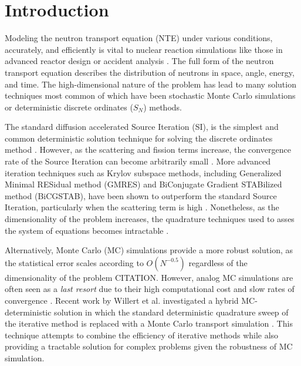\section{Introduction}
\label{sec:intro}

Modeling the neutron transport equation (NTE) under various conditions, accurately, and efficiently is vital to nuclear reaction simulations like those in advanced reactor design or accident analysis \cite{Duderstadt1977}.  The full form of the neutron transport equation describes the distribution of neutrons in space, angle, energy, and time. The high-dimensional nature of the problem has lead to many solution techniques most common of which have been stochastic Monte Carlo simulations or deterministic discrete ordinates ($S_N$) methods. 

The standard diffusion accelerated Source Iteration (SI), is the simplest and common deterministic solution technique for solving the discrete ordinates method \cite{Lewis1984}. However, as the scattering and fission terms increase, the convergence rate of the Source Iteration can become arbitrarily small \cite{Warsa2002}. More advanced iteration techniques such as Krylov subspace methods, including Generalized Minimal RESidual method (GMRES) and BiConjugate Gradient STABilized method (BiCGSTAB), have been shown to outperform the standard Source Iteration, particularly when the scattering term is high \cite{Adams2002, Mcclarren2012}. Nonetheless, as the dimensionality of the problem increases, the quadrature techniques used to asses the system of equations becomes intractable \cite{Willert2013Thesis}.

Alternatively, Monte Carlo (MC) simulations provide a more robust solution, as the statistical error scales according to $O(N^{-0.5})$ regardless of the dimensionality of the problem CITATION. However, analog MC simulations are often seen as a \textit{last resort} due to their high computational cost and slow rates of convergence \cite{McClarren2018}. Recent work  by Willert et al. investigated a hybrid MC-deterministic solution in which the standard deterministic quadrature sweep of the iterative method is replaced with a Monte Carlo transport simulation \cite{Willert2013Thesis, ctk:jeff1}. This technique attempts to combine the efficiency of iterative methods while also providing a tractable solution for complex problems given the robustness of MC simulation.

